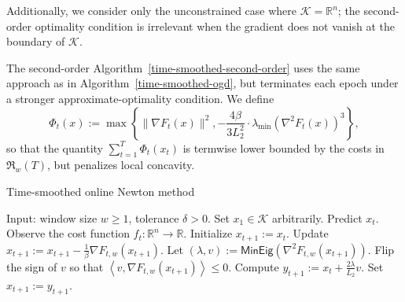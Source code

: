 \documentclass{article}
\def\reals{{\mathbb R}}
\def\norm#1{\mathopen\| #1 \mathclose\|}
\def\reals{{\mathbb R}}
\newcommand{\K}{\ensuremath{\mathcal K}}
\newcommand{\braces}[1]{\left\{#1\right\}}
\newcommand{\pa}[1]{\left(#1\right)}
\newcommand{\ang}[1]{\left<#1\right>}
\newcommand{\R}{\mathbb{R}}
\renewcommand{\K}{\mathcal{K}}
\newcommand{\Lmin}{\lambda_{\mathrm{min}}}
\newcommand{\regret}{\mathfrak{R}}
\begin{document}
Additionally, we consider only the unconstrained case where $\K = \R^n$; the second-order optimality condition is irrelevant when the gradient does not vanish at the boundary of $\K$.

The second-order Algorithm~\ref{time-smoothed-second-order} uses the same approach as in Algorithm~\ref{time-smoothed-ogd}, but terminates each epoch under a stronger approximate-optimality condition. We define
\[\Phi_t (x) := \max\braces{\norm{\nabla F_{t}(x)}^2, -\frac{4\beta}{3L_2^2} \cdot \Lmin(\nabla^2 F_{t}(x))^3 },\]
so that the quantity $\sum_{t=1}^T \Phi_t(x_t)$ is termwise lower bounded by the costs in $\regret_w (T)$, but penalizes local concavity.

\begin{algorithm}
\caption{Time-smoothed online Newton method}
\label{time-smoothed-second-order}
\begin{algorithmic}[1]
\STATE Input: window size $w \geq 1$, tolerance $\delta > 0$.
\STATE Set $x_1 \in \K$ arbitrarily.
\STATE Predict $x_t$. Observe the cost function $f_t:\R^n \to \reals$.
\STATE Initialize $x_{t+1} := x_t$.
\STATE Update $x_{t+1} := x_{t+1} - \frac{1}{\beta} \nabla F_{t,w}(x_{t+1})$.
\STATE Let $(\lambda, v) := \mathsf{MinEig}\pa{ \nabla^2 F_{t,w} (x_{t+1}) }$.
\STATE Flip the sign of $v$ so that $\ang{v, \nabla F_{t,w}(x_{t+1})} \leq 0$.
\STATE Compute $y_{t+1} := x_t + \frac{2\lambda}{L_2} v$.
\STATE Set $x_{t+1} := y_{t+1}$.
\ENDIF
\ENDIF
\ENDWHILE
\ENDFOR
\end{algorithmic}
\end{algorithm}
\end{document}
